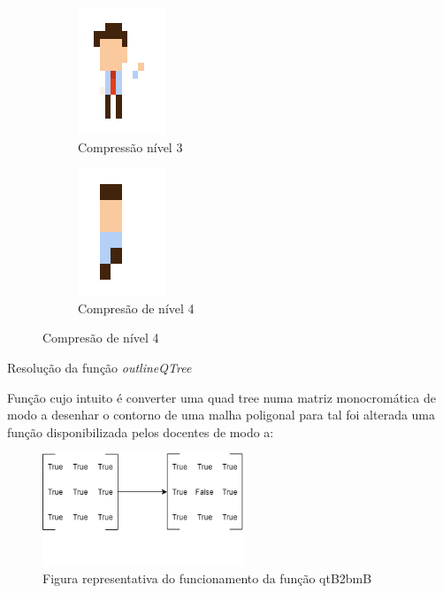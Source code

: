 \documentclass[a4paper]{article}
\begin{document}
\begin{figure}[H]
\begin{subfigure}{0.5\textwidth}
\end{subfigure}
%
\begin{subfigure}{0.5\textwidth}
\centering
\includegraphics[width=0.2\linewidth]{person3}
\caption{Compressão nível 3}
\end{subfigure}
%
\begin{subfigure}{0.5\textwidth}
\centering
\includegraphics[width=0.2\linewidth]{person4}
\caption{Compresão de nível 4}
\end{subfigure}
\end{figure}


\begin{center}
\large {Resolução da função \emph{outlineQTree}}
\end{center}

\par Função cujo intuito é converter uma quad tree numa matriz monocromática de modo 
a desenhar o contorno de uma malha poligonal para tal foi alterada uma função disponibilizada 
pelos docentes de modo a: 

\begin{figure}[H]
\begin{center}
    \includegraphics[width=6cm]{matrix} 
    \caption{Figura representativa do funcionamento da função qtB2bmB}
\end{center}
\end{figure}
\end{document}
